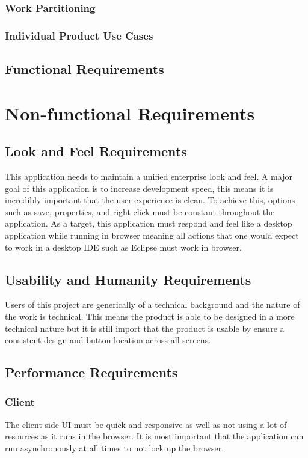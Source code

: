 \documentclass[12pt, titlepage]{article}
\begin{document}
    \subsubsection{Work Partitioning}

    \subsubsection{Individual Product Use Cases}

  \subsection{Functional Requirements}

\section{Non-functional Requirements}

  \subsection{Look and Feel Requirements}
  This application needs to maintain a unified enterprise look and feel. A
   major goal of this application is to increase development speed, this 
   means it is incredibly important that the user experience is clean. To 
   achieve this, options such as save, properties, and right-click must be 
   constant throughout the application. As a target, this application must 
   respond and feel like a desktop application while running in browser 
   meaning all actions that one would expect to work in a desktop IDE such
    as Eclipse must work in browser.

  \subsection{Usability and Humanity Requirements}
    Users of this project are generically of a technical background and the 
    nature of the work  is technical. This means the product is able to be 
    designed in a more technical nature but it is still import that the 
    product is usable by ensure a consistent design and button location across 
    all screens.

  \subsection{Performance Requirements}
    \subsubsection{Client}
    The client side UI must be quick and responsive as well as not using a 
    lot of resources as it runs in the browser. It is most important that the 
    application can run asynchronously at all times to not lock up the browser.
    
\end{document}
